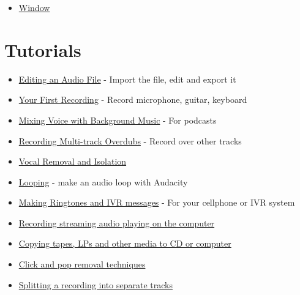 \begin{multicols}{2}
\begin{itemize}
\item 
\hyperref[\foo{manXwindowXmenuX}]{Window}

\end{itemize}

\label{indexXrefXbottom}
\label{indexXskiptheimage}
\label{indexXtutorials}
\section{Tutorials}
\begin{itemize}
\item 
\hyperref[\foo{manXtutorialXeditingXanXexistingXfileX}]{Editing an Audio File}
 - Import the file, edit and export it
\item 
\hyperref[\foo{manXtutorialXyourXfirstXrecordingX}]{Your First Recording}
 - Record microphone, guitar, keyboard
\item 
\hyperref[\foo{manXtutorialXmixingXaXnarrationXwithXbackgroundXmusicX}]{Mixing Voice with Background Music}
 - For podcasts
\item 
\hyperref[\foo{manXtutorialXrecordingXmultiXtrackXoverdubsX}]{Recording Multi-track Overdubs}
 - Record over other tracks
\item 
\hyperref[\foo{manXtutorialXvocalXremovalXandXisolationX}]{Vocal Removal and Isolation}

\item 
\hyperref[\foo{manXtutorialXloopingX}]{Looping}
 - make an audio loop with Audacity
\item 
\hyperref[\foo{manXtutorialXmakingXringtonesXandXivrXmessagesX}]{Making Ringtones and IVR messages}
 - For your cellphone or IVR system
\item 
\hyperref[\foo{manXtutorialXrecordingXaudioXplayingXonXtheXcomputerX}]{Recording streaming audio playing on the computer}

\end{itemize}

\begin{itemize}
\item 
\hyperref[\foo{manXtutorialXcopyingXtapesXlpsXorXminidiscsXtoXcdX}]{Copying tapes, LPs and other media to CD or computer}

\item 
\hyperref[\foo{manXtutorialXclickXandXpopXremovalXtechniquesX}]{Click and pop removal techniques}

\item 
\hyperref[\foo{manXsplittingXaXrecordingXintoXseparateXtracksX}]{Splitting a recording into separate tracks}


\end{itemize}
\end{multicols}
